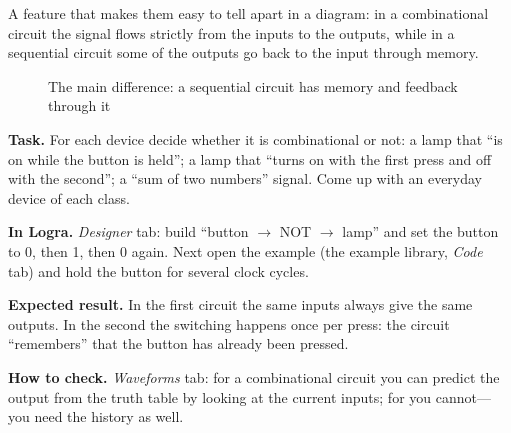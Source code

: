 A feature that makes them easy to tell apart in a diagram: in a combinational
circuit the signal flows strictly from the inputs to the outputs, while in a
sequential circuit some of the outputs go back to the input through memory.

\begin{figure}[H]
\centering
{}
\caption{The main difference: a sequential circuit has memory and feedback
through it}
\label{fig:comb_vs_seq}
\end{figure}

\begin{diybox}
\textbf{Task.}  For each device decide whether it is combinational or
not: a lamp that ``is on while the button is held''; a lamp that ``turns on
with the first press and off with the second''; a ``sum of two numbers''
signal.  Come up with an everyday device of each class.

\textbf{In Logra.} \emph{Designer} tab: build ``button $\to$ NOT $\to$
lamp'' and set the button to 0, then 1, then 0 again. Next open the example
 (the example library, \emph{Code} tab) and hold the button
for several clock cycles.

\textbf{Expected result.} In the first circuit the same inputs always give
the same outputs. In the second the switching happens once per press: the
circuit ``remembers'' that the button has already been pressed.

\textbf{How to check.} \emph{Waveforms} tab: for a combinational circuit you
can predict the output from the truth table by looking at the current inputs;
for  you cannot---you need the history as well.
\end{diybox}

